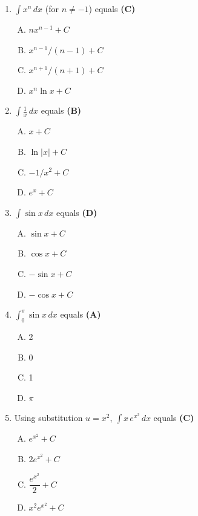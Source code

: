 \documentclass[10pt,a4paper]{article}
\begin{document}
\begin{enumerate}[1.]

\item $\displaystyle\int x^n\,dx$ (for $n \neq -1$) equals \hfill \textbf{(C)}
\begin{enumerate}[(A)]
    \item $nx^{n-1} + C$
    \item $x^{n-1}/(n-1) + C$
    \item $x^{n+1}/(n+1) + C$
    \item $x^n\ln x + C$
\end{enumerate}

\item $\displaystyle\int \frac{1}{x}\,dx$ equals \hfill \textbf{(B)}
\begin{enumerate}[(A)]
    \item $x + C$
    \item $\ln|x| + C$
    \item $-1/x^2 + C$
    \item $e^x + C$
\end{enumerate}

\item $\displaystyle\int \sin x\,dx$ equals \hfill \textbf{(D)}
\begin{enumerate}[(A)]
    \item $\sin x + C$
    \item $\cos x + C$
    \item $-\sin x + C$
    \item $-\cos x + C$
\end{enumerate}

\item $\displaystyle\int_0^{\pi} \sin x\,dx$ equals \hfill \textbf{(A)}
\begin{enumerate}[(A)]
    \item 2
    \item 0
    \item 1
    \item $\pi$
\end{enumerate}

\item Using substitution $u = x^2$, $\displaystyle\int x\,e^{x^2}\,dx$ equals \hfill \textbf{(C)}
\begin{enumerate}[(A)]
    \item $e^{x^2} + C$
    \item $2e^{x^2} + C$
    \item $\dfrac{e^{x^2}}{2} + C$
    \item $x^2 e^{x^2} + C$
\end{enumerate}


\end{enumerate}
\end{document}
